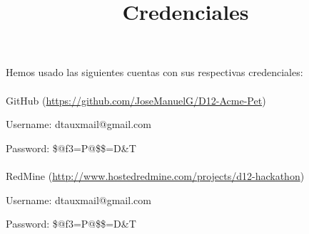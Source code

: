 \documentclass[a4paper]{article}
\title{Credenciales}
\date{}
\begin{document}
\setlength{\voffset}{-1in}
\setlength{\textheight}{680px}
\setlength{\headsep}{30px}
\maketitle

Hemos usado las siguientes cuentas con sus respectivas credenciales:
\\
\\
GitHub (\url{https://github.com/JoseManuelG/D12-Acme-Pet})

Username: dtauxmail@gmail.com

Password: \$@f3=P@\$\$=D\&T
\\
\\
RedMine (\url{http://www.hostedredmine.com/projects/d12-hackathon})

Username: dtauxmail@gmail.com

Password: \$@f3=P@\$\$=D\&T
\end{document}
